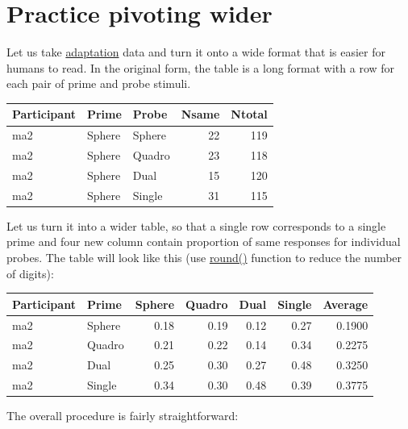 \documentclass[
]{book}
\begin{document}
\hypertarget{practice-pivoting-wider}{%
\section{Practice pivoting wider}\label{practice-pivoting-wider}}

Let us take \href{data/bands-adaptation.csv}{adaptation} data and turn it onto a wide format that is easier for humans to read. In the original form, the table is a long format with a row for each pair of prime and probe stimuli.

\begin{tabular}{l|l|l|r|r}
\hline
Participant & Prime & Probe & Nsame & Ntotal\\
\hline
ma2 & Sphere & Sphere & 22 & 119\\
\hline
ma2 & Sphere & Quadro & 23 & 118\\
\hline
ma2 & Sphere & Dual & 15 & 120\\
\hline
ma2 & Sphere & Single & 31 & 115\\
\hline
\end{tabular}

Let us turn it into a wider table, so that a single row corresponds to a single prime and four new column contain proportion of same responses for individual probes. The table will look like this (use \href{https://stat.ethz.ch/R-manual/R-devel/library/base/html/Round.html}{round()} function to reduce the number of digits):

\begin{tabular}{l|l|r|r|r|r|r}
\hline
Participant & Prime & Sphere & Quadro & Dual & Single & Average\\
\hline
ma2 & Sphere & 0.18 & 0.19 & 0.12 & 0.27 & 0.1900\\
\hline
ma2 & Quadro & 0.21 & 0.22 & 0.14 & 0.34 & 0.2275\\
\hline
ma2 & Dual & 0.25 & 0.30 & 0.27 & 0.48 & 0.3250\\
\hline
ma2 & Single & 0.34 & 0.30 & 0.48 & 0.39 & 0.3775\\
\hline
\end{tabular}

The overall procedure is fairly straightforward:
\end{document}
